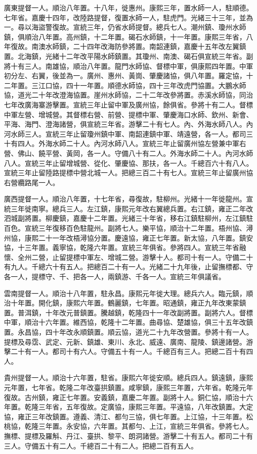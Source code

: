 \begin{pinyinscope}
廣東提督一人。順治八年置。十八年，徙惠州。康熙三年，置水師一人，駐順德。七年省。嘉慶十四年，改陸路提督，復置水師一人，駐虎門。光緒三十三年，並為一。尋以海盜警復故。宣統三年，仍省水師提督。總兵七人。潮州鎮、瓊州水師鎮，俱順治八年置。高州鎮，十二年置。碣石水師鎮，十一年置。康熙三年省，八年復故。南澳水師鎮，二十四年改海防參將置。南韶連鎮，嘉慶十五年改左翼鎮置。北海鎮，光緒十二年改平陽水師鎮置。其瓊州、南澳、碣石俱宣統三年省。副將十有三人。南雄協，順治八年置。龍門水師協、督標中軍，俱康熙四年置。中軍初分左、右翼，後並為一。廣州、惠州、黃崗、肇慶諸協，俱八年置。羅定協，十二年置。三江口協，四十一年置。順德水師協，四十三年改虎門協置。大鵬水師協，道光二十年改澄海協置。崖州水師協，二十二年改參將置。赤溪水師協，同治七年改廣海寨游擊置。宣統三年止留中軍及廣州協，餘俱省。參將十有二人。督標中軍左營、增城營。其督標右營、前營、提標中軍、肇慶海口水師、欽州、新會、平海、海門、澄海諸營，俱宣統三年省。游擊二十有七人。內、外海水師八人。內河水師三人。宣統三年止留瓊州鎮中軍、南韶連鎮中軍、靖遠營，各一人。都司三十有四人。外海水師二十人。內河水師八人。宣統三年止留廣州協左營兼中軍右營、佛山、饒平營、黃岡，各一人。守備八十有二人。外海水師二十人。內河水師八人。宣統三年止留增城營、從化、肇慶協、那扶，各一人。千總百六十有八人。宣統三年止留陸路提標中營北城一人。把總三百二十有七人。宣統三年止留廣州協右營纜路尾一人。

廣西提督一人。順治八年置，十七年省，尋復故，駐柳州。光緒十一年徙龍州。宣統三年徙南寧。總兵三人。左江鎮，康熙元年改右翼總兵置。右江鎮，雍正二年改泗城副將置。柳慶鎮，嘉慶十二年置。光緒三十年省，移右江鎮駐柳州，左江鎮駐百色。宣統三年復移百色駐龍州。副將七人。樂平協，順治十二年置。梧州協、潯州協，康熙二十一年改梧潯協分置。慶遠協，雍正七年置。新太協，八年置。鎮安協，十三年置。義寧協，乾隆六年置。宣統三年俱省。參將四人。宣統三年省融懷、全州二營，止留提標中軍左、增城二營。游擊十人。都司十有一人。守備二十有九人。千總六十有五人。把總百二十有一人。光緒二十九年後，止留撫標都、守各一人，提標守、千、把各一人，兩鎮游、千各一人。宣統三年俱議省。

雲南提督一人。順治十八年置，駐永昌。康熙元年徙大理。總兵六人。臨元鎮，順治十年置。開化鎮，康熙六年置。鶴麗鎮，七年置。昭通鎮，雍正九年改東蒙鎮置。普洱鎮，十年改元普鎮置。騰越鎮，乾隆四十一年改副將置。副將六人。督標中軍，順治十六年置。維西協，乾隆十二年置。曲尋協、楚雄協，俱三十五年改鎮置。永昌協，四十年改永順鎮置。順云協，道光二十九年改營置。參將十有一人。提標及尋霑、武定、元新、鎮雄、東川、永北、威遠、廣南、龍陵、鎮邊諸營。游擊二十有一人。都司十有六人。守備五十有一人。千總百有三人。把總二百十有四人。

貴州提督一人。順治十六年置，駐省。康熙六年徙安順。總兵四人。鎮遠鎮，康熙元年置，七年省。乾隆二年改臺拱鎮置。咸寧鎮，康熙三年置，六年省。乾隆元年復故。古州鎮，雍正七年置。安義鎮，嘉慶二年置。副將十人。銅仁協，順治十六年置。乾隆三年省，五年復故。定廣協，康熙三年置。平遠協，八年改鎮置。大定協，雍正三年改鎮置。遵義、清江、都勻三協，俱七年置。上江協，十三年置。松桃協，乾隆三年置。永安協，六年置。其都勻、上江，宣統三年俱省。參將七人。撫標、提標及羅斛、丹江、臺拱、黎平、朗洞諸營。游擊二十有五人。都司二十有三人。守備五十有二人。千總百二十有二人。把總二百有五人。


\end{pinyinscope}
